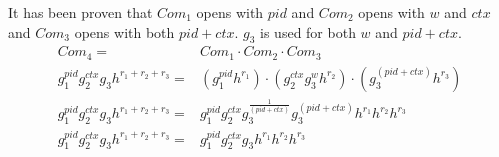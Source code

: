It has been proven that $Com_1$ opens with $pid$ and $Com_2$ opens with $w$ and $ctx$ and $Com_3$ opens with both $pid + ctx$. $g_3$ is used for both $w$ and $pid + ctx$.
\[
    \begin{aligned}
        Com_4 =& Com_1 \cdot Com_2 \cdot Com_3 \\
        g_1^{pid}g_2^{ctx}g_3h^{r_1 + r_2 + r_3} =& (g_1^{pid} h^{r_1}) \cdot (g_2^{ctx}g_3^{w} h^{r_2}) \cdot (g_3^{(pid + ctx)}h^{r_3}) \\
        g_1^{pid}g_2^{ctx}g_3h^{r_1 + r_2 + r_3} =& g_1^{pid}g_2^{ctx}g_3^{\frac{1}{(pid + ctx)}}g_3^{(pid + ctx)} h^{r_1}h^{r_2}h^{r_3}\\
        g_1^{pid}g_2^{ctx}g_3h^{r_1 + r_2 + r_3} =& g_1^{pid}g_2^{ctx}g_3h^{r_1}h^{r_2}h^{r_3}\\
    \end{aligned}
\]

